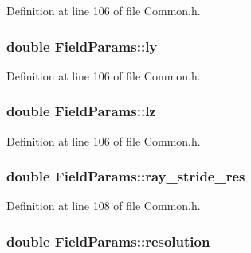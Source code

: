 Definition at line 106 of file Common.\+h.

\subsubsection[{\texorpdfstring{ly}{ly}}]{\setlength{\rightskip}{0pt plus 5cm}double Field\+Params\+::ly}\hypertarget{struct_field_params_afb39ded77b5714992e9b2f8c5d735d30}{}\label{struct_field_params_afb39ded77b5714992e9b2f8c5d735d30}


Definition at line 106 of file Common.\+h.

\subsubsection[{\texorpdfstring{lz}{lz}}]{\setlength{\rightskip}{0pt plus 5cm}double Field\+Params\+::lz}\hypertarget{struct_field_params_ae7532b58aed59f5b47233e57b67acc1a}{}\label{struct_field_params_ae7532b58aed59f5b47233e57b67acc1a}


Definition at line 106 of file Common.\+h.

\subsubsection[{\texorpdfstring{ray\+\_\+stride\+\_\+res}{ray_stride_res}}]{\setlength{\rightskip}{0pt plus 5cm}double Field\+Params\+::ray\+\_\+stride\+\_\+res}\hypertarget{struct_field_params_ae6eabaa6e593c9dbac48b2f96bea80ec}{}\label{struct_field_params_ae6eabaa6e593c9dbac48b2f96bea80ec}


Definition at line 108 of file Common.\+h.

\subsubsection[{\texorpdfstring{resolution}{resolution}}]{\setlength{\rightskip}{0pt plus 5cm}double Field\+Params\+::resolution}\hypertarget{struct_field_params_a520406c76b3abf392401626bc2161370}{}\label{struct_field_params_a520406c76b3abf392401626bc2161370}


